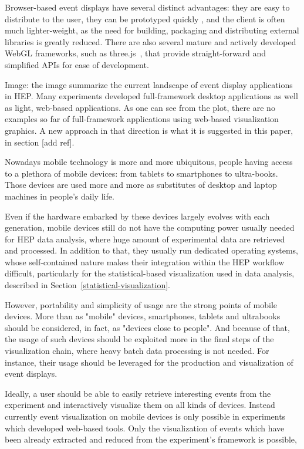 \documentclass[12pt,a4paper]{article}
\begin{document}
Browser-based event displays have several distinct advantages: they are easy to distribute to the user, they can be prototyped quickly
, and the client is often much lighter-weight, as the need for building, packaging and distributing external libraries is greatly reduced.
There are also several mature and actively developed WebGL frameworks, such as three.js~\cite{ThreeJSXXXX}, that provide straight-forward
and simplified APIs for ease of development.

Image: the image summarize the current landscape of event display applications in HEP. Many experiments developed
full-framework desktop applications as well as light, web-based applications. As one can see from the plot, there
are no examples so far of full-framework applications using web-based visualization graphics. A new approach in that
direction is what it is suggested in this paper, in section [add ref].

Nowadays mobile technology is more and more ubiquitous, people having access to a plethora of mobile devices: from tablets to
smartphones to ultra-books. Those devices are used more and more as substitutes of desktop and laptop machines in people's daily life.

Even if the hardware embarked by these devices largely evolves with each generation, mobile devices still do not have the computing
power usually needed for HEP data analysis, where huge amount of experimental data are retrieved and processed. In addition to that,
they usually run dedicated operating systems, whose self-contained nature makes their integration within the HEP workflow difficult,
particularly for the statistical-based visualization used in data analysis, described in Section~\ref{statistical-visualization}.

However, portability and simplicity of usage are the strong points of mobile devices. More than as "mobile" devices, smartphones,
tablets and ultrabooks should be considered, in fact, as "devices close to people". And because of that, the usage of such devices
should be exploited more in the final steps of the visualization chain, where heavy batch data processing is not needed. For instance,
their usage should be leveraged for the production and visualization of event displays.

Ideally, a user should be able to easily retrieve interesting events from the experiment and interactively visualize them on all
kinds of devices. Instead currently event visualization on mobile devices is only possible in experiments which developed web-based tools.
Only the visualization of events which have been already extracted and reduced from the experiment's framework is possible,
\end{document}
